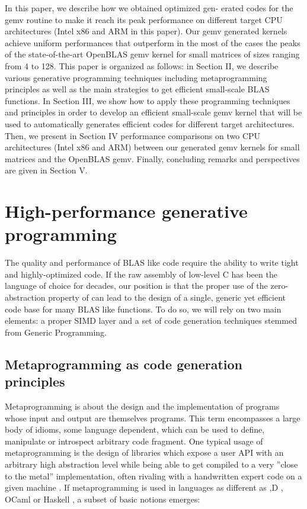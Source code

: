 \documentclass[../main]{subfiles}
\begin{document}
In this paper, we describe how we obtained optimized gen-
erated \cpp codes for the gemv routine to make it reach its
peak performance on different target CPU architectures (Intel
x86 and ARM in this paper). Our gemv \cpp generated kernels
achieve uniform performances that outperform in the most of
the cases the peaks of the state-of-the-art OpenBLAS gemv
kernel for small matrices of sizes ranging from 4 to 128.
This paper is organized as follows: in Section II, we describe
various generative programming techniques including metaprogramming
principles as well as the main strategies to get
efficient small-scale BLAS functions. In Section III, we show
how to apply these programming techniques and principles
in order to develop an efficient small-scale gemv kernel that
will be used to automatically generates efficient \cpp codes for
different target architectures. Then, we present in Section IV
performance comparisons on two CPU architectures (Intel
x86 and ARM) between our generated gemv kernels for
small matrices and the OpenBLAS gemv. Finally, concluding
remarks and perspectives are given in Section V.

\section{
  High-performance generative programming
}

The quality and performance of BLAS like code require
the ability to write tight and highly-optimized code. If the
raw assembly of low-level C has been the language of choice
for decades, our position is that the proper use of the zero-
abstraction property of \cpp can lead to the design of a single,
generic yet efficient code base for many BLAS like functions.
To do so, we will rely on two main elements: a proper \cpp
SIMD layer and a set of code generation techniques stemmed
from Generic Programming.

\subsection{
  Metaprogramming as code generation principles
}

Metaprogramming \cite{hpcs7} is about the design and the
implementation of programs whose input and output
are themselves programs. This term encompasses a large
body of idioms, some language dependent, which can be used
to define, manipulate or introspect arbitrary code fragment.
One typical usage of metaprogramming is the design of
libraries which expose a user API with an arbitrary high
abstraction level while being able to get compiled to a very
”close to the metal” implementation, often rivaling with a
handwritten expert code on a given machine \cite{hpcs8}.
If metaprogramming is used in languages as different as
\cpp \cite{hpcs9},D \cite{hpcs10}, OCaml \cite{hpcs11}
or Haskell \cite{hpcs12}, a subset of
basic notions emerges:
\end{document}

